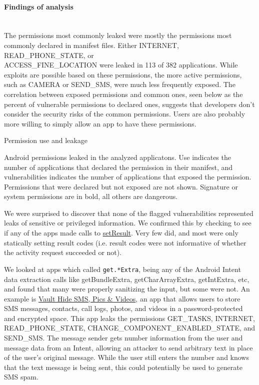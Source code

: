 \documentclass[12pt,a4paper]{article}
\begin{document}
\paragraph{Findings of analysis} ~\\
The permissions most commonly leaked were mostly the permissions most commonly
declared in manifest files. Either INTERNET, READ\_PHONE\_STATE, or\\
ACCESS\_FINE\_LOCATION were leaked in 113 of 382 applications. While exploits
are possible based on these permissions, the more active permissions, such as
CAMERA or SEND\_SMS, were much less frequently exposed. The correlation between
exposed permissions and common ones, seen below as the percent of vulnerable
permissions to declared ones, suggests that developers don't consider the
security risks of the common permissions. Users are also probably more willing
to simply allow an app to have these permissions.
\begin{table}
\caption{Permission use and leakage}

\caption*{Android permissions leaked in the analyzed applicatons. Use indicates
  the number of applications that declared the permission in their
  manifest, and vulnerabilities indicates the number of applications that
  exposed the permission.  Permissions that were declared but not exposed
  are not shown. Signature or system permissions are in bold, all others
  are dangerous.}
\end{table}

We were surprised to discover that none of the flagged vulnerabilities
represented leaks of sensitive or privileged information. We confirmed this by
checking to see if any of the apps made calls to
\href{https://developer.android.com/reference/android/app/Activity.html#setResult\%28int\%29}{setResult}. Very
few did, and most were only statically setting result codes (i.e. result codes
were not informative of whether the activity request succeeded or not).

We looked at apps which called \texttt{get.*Extra}, being any of the Android
Intent data extraction calls like getBundleExtra, getCharArrayExtra,
getIntExtra, etc, and found that many were properly sanitizing the input, but
some were not. An example is
\href{https://play.google.com/store/apps/details?id=com.netqin.ps\&feature=search\_result#?t=W251bGwsMSwxLDEsImNvbS5uZXRxaW4ucHMiXQ..}{Vault
Hide SMS, Pics \& Videos}, an app that allows users to store SMS messages,
contacts, call logs, photos, and videos in a password-protected and encrypted
space. This app leaks the permissions GET\_TASKS, INTERNET, READ\_PHONE\_STATE,
CHANGE\_COMPONENT\_ENABLED\_STATE, and SEND\_SMS. The message sender gets number
information from the user and message data from an Intent, allowing an attacker
to send arbitrary text in place of the user's original message. While the user
still enters the number and knows that the text message is being sent, this
could potentially be used to generate SMS spam.
\end{document}
